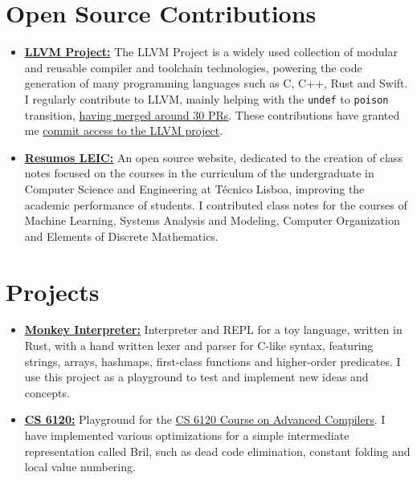 \documentclass[a4paper,11pt]{article}
\begin{document}
\section{Open Source Contributions}
 \begin{itemize}[leftmargin=*]
  \item\small{
    \textbf{\href{https://github.com/llvm/llvm-project/pulls?q=author:pedroclobo}{LLVM Project:}}{
      The LLVM Project is a widely used collection of modular and reusable compiler and toolchain technologies, powering the code generation of many programming languages such as C, C++, Rust and Swift.
      I regularly contribute to LLVM, mainly helping with the \texttt{undef} to \texttt{poison} transition, \href{https://github.com/llvm/llvm-project/pulls?q=author:pedroclobo}{having merged around 30 PRs}.
      These contributions have granted me \href{https://github.com/llvm/llvm-project/issues/129447}{commit access to the LLVM project}.
    \vspace{-2pt}}
  }\vspace{-4pt}
  \item\small{
    \textbf{\href{https://github.com/leic-pt/resumos-leic/pulls?q=author:pedroclobo}{Resumos LEIC:}}{
      An open source website, dedicated to the creation of class notes focused on the courses in the curriculum of the undergraduate in Computer Science and Engineering at Técnico Lisboa, improving the academic performance of students.
      I contributed class notes for the courses of Machine Learning, Systems Analysis and Modeling, Computer Organization and Elements of Discrete Mathematics.
    \vspace{-2pt}}
  }\vspace{-4pt}
 \end{itemize}

\section{Projects}
  \begin{itemize}[leftmargin=*]
    \item\small{
      \textbf{\href{https://github.com/pedroclobo/monkey-interpreter}{Monkey Interpreter:}}{
        Interpreter and REPL for a toy language, written in Rust, with a hand written lexer and parser for C-like syntax, featuring strings, arrays, hashmaps, first-class functions and higher-order predicates.
        I use this project as a playground to test and implement new ideas and concepts.
      \vspace{-2pt}}
    }\vspace{-4pt}
    \item\small{
      \textbf{\href{https://github.com/pedroclobo/cs-6120}{CS 6120:}}{
        Playground for the \href{https://www.cs.cornell.edu/courses/cs6120/2020fa/self-guided/}{CS 6120 Course on Advanced Compilers}.
        I have implemented various optimizations for a simple intermediate representation called Bril, such as dead code elimination, constant folding and local value numbering.
      \vspace{-2pt}}
    }\vspace{-4pt}
  \end{itemize}
\end{document}

